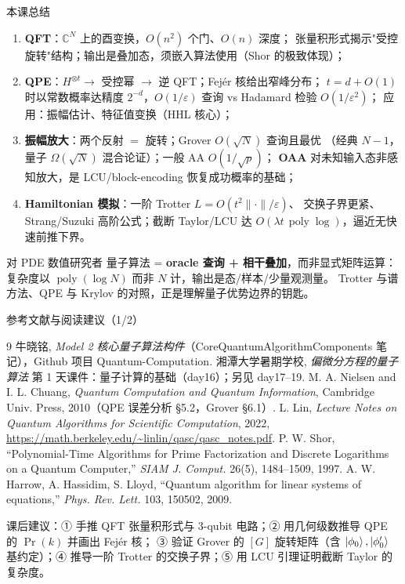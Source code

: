 \documentclass[aspectratio=169,10pt]{ctexbeamer}
\newcommand{\C}{\mathbb{C}}
\newcommand{\eps}{\varepsilon}
\newcommand{\poly}{\operatorname{poly}}
\begin{document}
\begin{frame}{本课总结}
\begin{enumerate}
\item \textbf{QFT}：$\C^N$ 上的酉变换，$O(n^2)$ 个门、$O(n)$ 深度；
张量积形式揭示"受控旋转"结构；输出是叠加态，须嵌入算法使用（Shor 的极致体现）；
\item \textbf{QPE}：$H^{\otimes t}\to$ 受控幂 $\to$ 逆 QFT；Fejér 核给出窄峰分布；
$t=d+O(1)$ 时以常数概率达精度 $2^{-d}$，$O(1/\eps)$ 查询 vs Hadamard 检验 $O(1/\eps^2)$；
应用：振幅估计、特征值变换（HHL 核心）；
\item \textbf{振幅放大}：两个反射 $=$ 旋转；Grover $O(\sqrt N)$ 查询且最优
（经典 $N-1$，量子 $\Omega(\sqrt N)$ 混合论证）；一般 AA $O(1/\sqrt p)$；
\textbf{OAA} 对未知输入态非感知放大，是 LCU/block-encoding 恢复成功概率的基础；
\item \textbf{Hamiltonian 模拟}：一阶 Trotter $L=O(t^2\|\cdot\|/\eps)$、
交换子界更紧、Strang/Suzuki 高阶公式；截断 Taylor/LCU 达
$O(\lambda t\,\poly\log)$，逼近无快速前推下界。
\end{enumerate}
\begin{keybox}{对 PDE 数值研究者}
量子算法 = \textbf{oracle 查询 + 相干叠加}，而非显式矩阵运算：
复杂度以 $\poly(\log N)$ 而非 $N$ 计，输出是态/样本/少量观测量。
Trotter 与谱方法、QPE 与 Krylov 的对照，正是理解量子优势边界的钥匙。
\end{keybox}
\end{frame}

\begin{frame}{参考文献与阅读建议（1/2）}
\scriptsize
\begin{thebibliography}{9}
 牛晓铭, \emph{Model 2 核心量子算法构件}（CoreQuantumAlgorithmComponents 笔记），Github 项目 Quantum-Computation.
 湘潭大学暑期学校, \emph{偏微分方程的量子算法} 第 1 天课件：量子计算的基础（day16）；另见 day17--19.
 M. A. Nielsen and I. L. Chuang, \emph{Quantum Computation and Quantum Information}, Cambridge Univ. Press, 2010（QPE 误差分析 §5.2，Grover §6.1）.
 L. Lin, \emph{Lecture Notes on Quantum Algorithms for Scientific Computation}, 2022, \url{https://math.berkeley.edu/~linlin/qasc/qasc_notes.pdf}.
 P. W. Shor, ``Polynomial-Time Algorithms for Prime Factorization and Discrete Logarithms on a Quantum Computer,'' \emph{SIAM J. Comput.} 26(5), 1484--1509, 1997.
 A. W. Harrow, A. Hassidim, S. Lloyd, ``Quantum algorithm for linear systems of equations,'' \emph{Phys. Rev. Lett.} 103, 150502, 2009.
\end{thebibliography}
\vspace{1mm}
{\tiny\color{graytext}课后建议：① 手推 QFT 张量积形式与 3-qubit 电路；② 用几何级数推导 QPE 的 $\Pr(k)$ 并画出 Fejér 核；
③ 验证 Grover 的 $[G]$ 旋转矩阵（含 $\ket{\phi_0},\ket{\phi_0'}$ 基约定）；④ 推导一阶 Trotter 的交换子界；⑤ 用 LCU 引理证明截断 Taylor 的复杂度。}
\end{frame}
\end{document}
